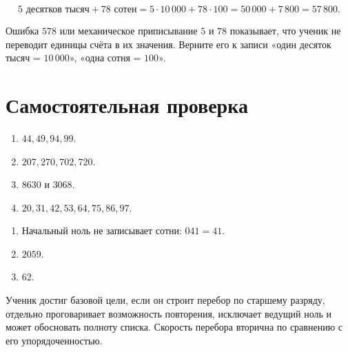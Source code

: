 \[
  5\text{ десятков тысяч}+78\text{ сотен}
  =5\cdot10\,000+78\cdot100
  =50\,000+7\,800
  =\boxed{57\,800}.
\]

\begin{teacherbox}
  Ошибка \(578\) или механическое приписывание \(5\) и \(78\) показывает,
  что ученик не переводит единицы счёта в их значения. Верните его к записи
  «один десяток тысяч = \(10\,000\)», «одна сотня = \(100\)».
\end{teacherbox}

\section{Самостоятельная проверка}

\begin{fillbox}[Ответы]
  \begin{enumerate}
    \item \(44,49,94,99\).
    \item \(207,270,702,720\).
    \item \(8630\) и \(3068\).
    \item \(20,31,42,53,64,75,86,97\).
  \end{enumerate}
\end{fillbox}

\begin{checkpointbox}
  \begin{enumerate}
    \item Начальный ноль не записывает сотни: \(041=41\).
    \item \(2059\).
    \item \(62\).
  \end{enumerate}
\end{checkpointbox}

\begin{teacherbox}
  Ученик достиг базовой цели, если он строит перебор по старшему разряду,
  отдельно проговаривает возможность повторения, исключает ведущий ноль и
  может обосновать полноту списка. Скорость перебора вторична по сравнению
  с его упорядоченностью.
\end{teacherbox}
